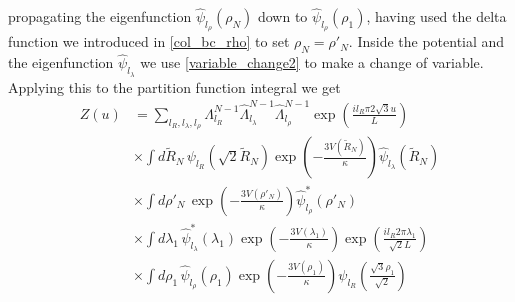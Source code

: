 %
propagating the eigenfunction $\hat{\psi}_{l_\rho}\left(\rho_{N}\right)$ down to $\hat{\psi}_{l_\rho}\left(\rho_{1}\right)$, having used the delta function we introduced in \eqref{col_bc_rho} to set $\rho_{N}=\rho'_{N}$. Inside the potential and the eigenfunction $\hat{\psi}_{l_\lambda}$ we use \eqref{variable_change2} to make a change of variable. Applying this to the partition function integral we get
%
\begin{align}\label{col_z_int_intact8}
Z\left(u\right) &= \sum_{l_R,l_\lambda,l_\rho}\Lambda_{l_R}^{N-1}\hat{\Lambda}_{l_\lambda}^{N-1}\hat{\Lambda}_{l_\rho}^{N-1}\exp\left(\frac{il_{R}\pi 2\sqrt{3}u}{L}\right)\nonumber\\
&\times\int d\tilde{R}_N\,\psi_{l_R}\left(\sqrt{2}\tilde{R}_{N}\right)\exp\left(-\frac{3V\left(\tilde{R}_N\right)}{\kappa}\right)\hat{\psi}_{l_\lambda}\left(\tilde{R}_N\right)\nonumber\\
&\times\int d\rho'_N\,\exp\left(-\frac{3V(\rho'_{N})}{\kappa}\right)\hat{\psi}^{*}_{l_\rho}\left(\rho'_{N}\right)\nonumber\\
&\times\int d\lambda_1\, \hat{\psi}^{*}_{l_\lambda}\left(\lambda_{1}\right)\exp\left(-\frac{3V(\lambda_{1})}{\kappa}\right)\exp\left(\frac{il_{R}2\pi\lambda_1}{\sqrt{2}L} \right)\nonumber\\
&\times\int d\rho_1\, \hat{\psi}_{l_\rho}\left(\rho_{1}\right) \exp\left(-\frac{3V(\rho_{1})}{\kappa}\right)\psi_{l_R}\left( \frac{\sqrt{3}\rho_1}{\sqrt{2}}\right)
\end{align}
%
